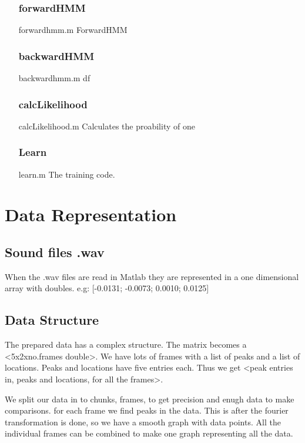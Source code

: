 \documentclass[titlepage]{article}
\begin{document}
\begin{itemize}
\subsubsection{forwardHMM}\item[forwardhmm.m] ForwardHMM 
\subsubsection{backwardHMM}\item[backwardhmm.m] df
\subsubsection{calcLikelihood}\item[calcLikelihood.m] Calculates the proability of one 
\subsubsection{Learn}\item[learn.m] The training code.   

\end{itemize}


\section{Data Representation}
    \subsection{Sound files .wav} 
When the .wav files are read in Matlab they are represented in a one dimensional array with doubles. e.g: [-0.0131; -0.0073; 0.0010; 0.0125]
    \subsection{Data Structure}
The prepared data has a complex structure. The matrix becomes a <5x2xno.frames double>. We have lots of frames with a list of peaks and a list of locations. Peaks and locations have five entries each. Thus we get <peak entries in, peaks and locations, for all the frames>. 

We split our data in to chunks, frames, to get precision and enugh data to make comparisons. for each frame we find peaks in the data. This is after the fourier transformation is done, so we have a smooth graph with data points. All the individual frames can be combined to make one graph representing all the data. 
\end{document}
